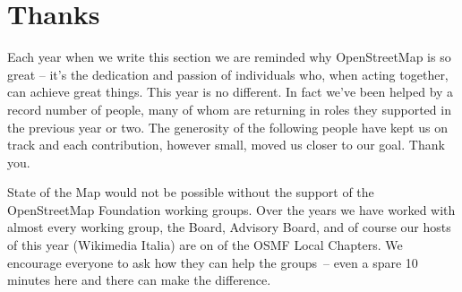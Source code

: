 \newpage
\section*{Thanks}
\label{thanks}
\pagestyle{cropmarksstyle}

Each year when we write this section we are reminded why OpenStreetMap is so great -- it's the dedication
and passion of individuals who, when acting together, can achieve great things. This year is no
different. In fact we've been helped by a record number of people, many of whom are returning in
roles they supported in the previous year or two. The generosity of the following people have kept
us on track and each contribution, however small, moved us closer to our goal. Thank you.

State of the Map would not be possible without the support of the OpenStreetMap Foundation working
groups. Over the years we have worked with almost every working group, the Board, Advisory Board,
and of course our hosts of this year (Wikimedia Italia) are on of the OSMF Local Chapters. We 
encourage everyone to ask how they can help the groups~-- even a spare 10 minutes here and there can
make the difference.

